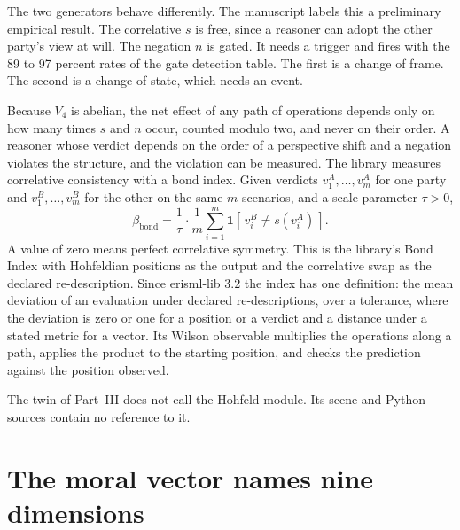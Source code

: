 The two generators behave differently. The manuscript labels this a preliminary empirical
result. The correlative $s$ is free, since a reasoner can adopt the other party's view at will.
The negation $n$ is gated. It needs a trigger and fires with the 89 to 97 percent rates of the
gate detection table. The first is a change of frame. The second is a change of state, which
needs an event.

Because $V_4$ is abelian, the net effect of any path of operations depends only on how many times
$s$ and $n$ occur, counted modulo two, and never on their order. A reasoner whose verdict depends on
the order of a perspective shift and a negation violates the structure, and the violation can be
measured.
The library measures correlative consistency with a bond index. Given verdicts $v^A_1,\dots,v^A_m$
for one party and $v^B_1,\dots,v^B_m$ for the other on the same $m$ scenarios, and a scale
parameter $\tau>0$,
\begin{equation}
\beta_{\mathrm{bond}} = \frac{1}{\tau}\cdot\frac{1}{m}\sum_{i=1}^{m}
\mathbf{1}\!\left[\, v^B_i \neq s(v^A_i) \,\right] .
\label{eq:ge-bondindex}
\end{equation}
A value of zero means perfect correlative symmetry.
This is the library's Bond Index with Hohfeldian positions as the output and the correlative
swap as the declared re-description. Since erisml-lib 3.2 the index has one definition: the mean
deviation of an evaluation under declared re-descriptions, over a tolerance, where the deviation is
zero or one for a position or a verdict and a distance under a stated metric for a vector.
Its Wilson observable multiplies the operations along a path, applies the product to the starting
position, and checks the prediction against the position observed.

The twin of Part~III does not call the Hohfeld module. Its scene and Python sources contain no
reference to it.

\section{The moral vector names nine dimensions}\label{sec:ge-vector}

